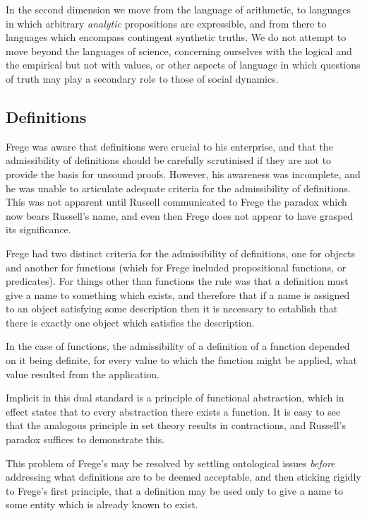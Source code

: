 In the second dimension we move from the language of arithmetic, to languages in which arbitrary {\it analytic} propositions are expressible, and from there to languages which encompass contingent synthetic truths.
We do not attempt to move beyond the languages of science, concerning ourselves with the logical and the empirical but not with values, or other aspects of language in which questions of truth may play a secondary role to those of social dynamics.

\subsection{Definitions}

Frege was aware that definitions were crucial to his enterprise, and that the admissibility of definitions should be carefully scrutinised if they are not to provide the basis for unsound proofs.
However, his awareness was incomplete, and he was unable to articulate adequate criteria for the admissibility of definitions.
This was not apparent until Russell communicated to Frege the paradox which now bears Russell's name, and even then Frege does not appear to have grasped its significance.

Frege had two distinct criteria for the admissibility of definitions, one for objects and another for functions (which for Frege included propositional functions, or predicates).
For things other than functions the rule was that a definition must give a name to something which exists, and therefore that if a name is assigned to an object satisfying some description then it is necessary to establish that there is exactly one object which satisfies the description.

In the case of functions, the admissibility of a definition of a function depended on it being definite, for every value to which the function might be applied, what value resulted from the application. 

Implicit in this dual standard is a principle of functional abstraction, which in effect states that to every abstraction there exists a function.
It is easy to see that the analogous principle in set theory results in contractions, and Russell's paradox suffices to demonstrate this.

This problem of Frege's may be resolved by settling ontological issues {\it before} addressing what definitions are to be deemed acceptable, and then sticking rigidly to Frege's first principle, that a definition may be used only to give a name to some entity which is already known to exist.


